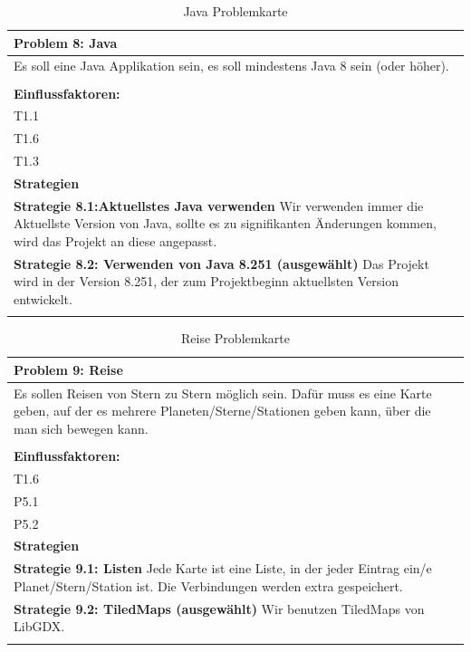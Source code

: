 \documentclass[fontsize=12pt,paper=a4,twoside]{scrartcl}
\begin{document}
\begin{table}[H]
    \centering
    \begin{tabular}{|p{15cm}|}
    \hline
          \textbf{Problem 8: Java}  \\ \hline
	Es soll eine Java Applikation sein, es soll mindestens Java 8 sein (oder höher). \\
         \\ \hline
          \textbf{Einflussfaktoren: } \\
	T1.1 \\
	T1.6 \\
	T1.3 \\
          \hline
          \textbf{Strategien} \\ \hline
            {}          
           \label{strategie:8.1}     
          \textbf{Strategie 8.1:Aktuellstes Java verwenden} Wir verwenden immer die Aktuellste Version von Java, sollte es zu signifikanten Änderungen kommen, wird das Projekt an diese angepasst.\\        
  {}          
           \label{strategie:8.2}              
          \textbf{Strategie 8.2: Verwenden von Java 8.251 (ausgewählt)} Das Projekt wird in der Version 8.251, der zum Projektbeginn aktuellsten Version entwickelt. \\
	 \\ \hline
    \end{tabular}

    \caption{Java Problemkarte}
    \label{tab:ProblemKarte8}
\end{table}

\begin{table}[H]
    \centering
    \begin{tabular}{|p{15cm}|}
    \hline
          \textbf{Problem 9: Reise}  \\ \hline
	Es sollen Reisen von Stern zu Stern möglich sein. Dafür muss es eine Karte geben, auf der es mehrere Planeten/Sterne/Stationen geben kann, über die man sich bewegen kann. \\
         \\ \hline
          \textbf{Einflussfaktoren: } \\
	T1.6 \\
	P5.1 \\
	P5.2 \\
          \hline
          \textbf{Strategien} \\ \hline
            {}          
           \label{strategie:9.1}     
          \textbf{Strategie 9.1: Listen} Jede Karte ist eine Liste, in der jeder Eintrag ein/e Planet/Stern/Station ist. Die Verbindungen werden extra gespeichert.  \\        
  {}          
           \label{strategie:9.2}              
          \textbf{Strategie 9.2: TiledMaps  (ausgewählt)} Wir benutzen TiledMaps von LibGDX.  \\
	 \\ \hline
    \end{tabular}

    \caption{Reise Problemkarte}
    \label{tab:ProblemKarte9}
\end{table}
\end{document}
